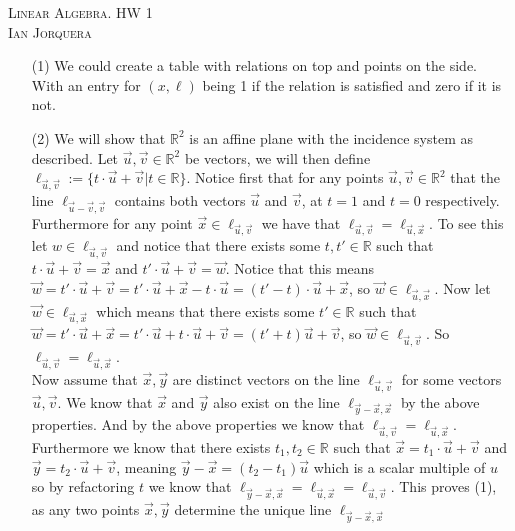 \documentclass[12pt]{amsart}
\theoremstyle{definition}
\newcommand{\R}{\mathbb{R}}
\begin{document}
\begin{center}
    \textsc{Linear Algebra. HW 1\\ Ian Jorquera}
\end{center}
\vspace{1em}

\begin{itemize}
\item[(1)] %
We could create a table with relations on top and points on the side. With an entry for $(x,\ell)$ being 1 if the relation is satisfied and zero if it is not.\\

\item[(2)]
We will show that $\R^2$ is an affine plane with the incidence system as described.
Let $\vec{u},\vec{v}\in \R^2$ be vectors, we will then define $\ell_{\vec{u},\vec{v}}:=\{t\cdot \vec{u}+\vec{v}|t\in\R\}$. Notice first that for any points $\vec{u},\vec{v}\in \R^2$ that the line $\ell_{\vec{u}-\vec{v},\vec{v}}$ contains both vectors $\vec{u}$ and $\vec{v}$, at $t=1$ and $t=0$ respectively. Furthermore for any point $\vec x\in \ell_{\vec{u}, \vec{v}}$ we have that $\ell_{\vec{u}, \vec{v}}=\ell_{\vec{u}, \vec{x}}$. To see this let $w\in \ell_{\vec{u}, \vec{v}}$ and notice that there exists some $t,t'\in \R$ such that $t\cdot \vec{u}+\vec{v}=\vec{x}$ and $t'\cdot \vec{u}+\vec{v}=\vec{w}$. Notice that this means $\vec{w}=t'\cdot \vec{u}+\vec{v}=t'\cdot \vec{u}+\vec{x}-t\cdot \vec{u}=(t'-t)\cdot \vec{u}+\vec{x}$, so $\vec{w}\in\ell_{\vec{u},\vec{x}}$. Now let $\vec{w}\in\ell_{\vec{u},\vec{x}}$ which means that there exists some $t'\in \R$ such that $\vec{w}=t'\cdot \vec{u}+\vec{x}=t'\cdot \vec{u}+t\cdot \vec{u}+\vec{v}=(t'+t)\vec{u}+\vec{v}$, so $\vec{w}\in \ell_{\vec{u},\vec{v}}$. So $\ell_{\vec{u},\vec{v}}=\ell_{\vec{u},\vec{x}}$. \\

Now assume that $\vec{x},\vec{y}$ are distinct vectors on the line $\ell_{\vec{u},\vec{v}}$ for some vectors $\vec{u},\vec{v}$. We know that $\vec{x}$ and $\vec{y}$ also exist on the line $\ell_{\vec{y}-\vec{x},\vec{x}}$ by the above properties. 
And by the above properties we know that $\ell_{\vec{u},\vec{v}}=\ell_{\vec{u},\vec{x}}$. Furthermore we know 
that there exists $t_1,t_2\in \R$ such that $\vec{x}=t_1\cdot \vec{u}+\vec{v}$ 
and $\vec{y}=t_2\cdot \vec{u}+\vec{v}$, meaning $\vec{y}-\vec{x}=(t_2-t_1)\vec{u}$ which is 
a scalar multiple of $u$ so by refactoring $t$ we know that $\ell_{\vec{y}-\vec{x},\vec{x}}=\ell_{\vec{u},\vec{x}}=\ell_{\vec{u}, \vec{v}}$.
This proves (1), as any two points $\vec{x},\vec{y}$ determine the unique line $\ell_{\vec{y}-\vec{x},\vec{x}}$\\


\end{itemize}
\end{document}
